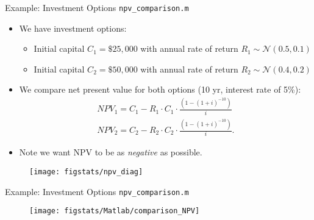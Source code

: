 \documentclass[handout,9pt]{beamer}
\begin{document}
%
\begin{frame}{Example: Investment Options \footnotesize{\texttt{npv\_comparison.m}}}
\begin{itemize}
\item We have investment options:
\begin{itemize}
\item Initial capital $C_1=\$25,000$ with annual rate of return $R_1\sim \mathcal{N}(0.5,0.1)$
\item Initial capital $C_2=\$50,000$ with annual rate of return $R_2\sim \mathcal{N}(0.4,0.2)$
\end{itemize}
\item We compare net present value for both options (10 yr, interest rate of 5\%):
\begin{align*}
NPV_1=C_1 - R_1\cdot C_1\cdot \frac{(1-(1+i)^{-10})}{i}\\
NPV_2=C_2 - R_2\cdot C_2\cdot \frac{(1-(1+i)^{-10})}{i}.
\end{align*}
\item Note we want NPV to be as {\em negative} as possible. 
\end{itemize}

\begin{figure}[!htb]
    \centering
	\texttt{[image: figstats/npv\_diag]}
\end{figure}

\end{frame}

%
\begin{frame}{Example: Investment Options \footnotesize{\texttt{npv\_comparison.m}}}

\begin{figure}[!htb]
    \centering
	\texttt{[image: figstats/Matlab/comparison\_NPV]}
\end{figure}

\end{frame}
\end{document}

